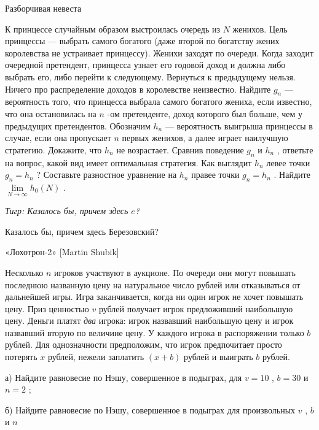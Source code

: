 \begin{problem}
 Разборчивая невеста\par
К принцессе случайным образом выстроилась очередь из  $N$  женихов. Цель принцессы — выбрать самого богатого (даже второй по богатству жених королевства не устраивает принцессу). Женихи заходят по очереди. Когда заходит очередной претендент, принцесса узнает его годовой доход и должна либо выбрать его, либо перейти к следующему. Вернуться к предыдущему нельзя. Ничего про распределение доходов в королевстве неизвестно.
Найдите  $g_{n} $  — вероятность того, что принцесса выбрала самого богатого жениха, если известно, что она остановилась на  $n$ -ом претенденте, доход которого был больше, чем у предыдущих претендентов.
Обозначим  $h_{n} $  — вероятность выигрыша принцессы в случае, если она пропускает  $n$  первых женихов, а далее играет наилучшую стратегию. Докажите, что  $h_{n} $  не возрастает. Сравнив поведение  $g_{n} $  и  $h_{n} $ , ответьте на вопрос, какой вид имеет оптимальная стратегия. Как выглядит  $h_{n} $  левее точки  $g_{n} =h_{n} $ ? Составьте разностное уравнение на  $h_{n} $  правее точки  $g_{n} =h_{n} $ .
Найдите  $\mathop{\lim }\limits_{N\to \infty } h_{0} \left(N\right)$ .
{\it Тигр: Казалось бы, причем здесь  $e$? \par
Казалось бы, причем здесь Березовский?}



\begin{sol}

\end{sol}
\end{problem}



\begin{problem}
 «Лохотрон-2» [Martin Shubik]\par
Несколько  $n$  игроков участвуют в аукционе. По очереди они могут повышать последнюю названную цену на натуральное число рублей или отказываться от дальнейшей игры. Игра заканчивается, когда ни один игрок не хочет повышать цену. Приз ценностью  $v$  рублей получает игрок предложивший наибольшую цену. Деньги платят {\it два} игрока: игрок назвавший наибольшую цену и игрок назвавший вторую по величине цену. У каждого игрока в распоряжении только  $b$  рублей. Для однозначности предположим, что игрок предпочитает просто потерять  $x$  рублей, нежели заплатить  $\left(x+b\right)$  рублей и выиграть  $b$  рублей.\par
а) Найдите равновесие по Нэшу, совершенное в подыграх, для  $v=10$ ,  $b=30$  и  $n=2$ ;\par
б) Найдите равновесие по Нэшу, совершенное в подыграх для произвольных  $v$ ,  $b$  и  $n$\par



\begin{sol}

\end{sol}
\end{problem}



